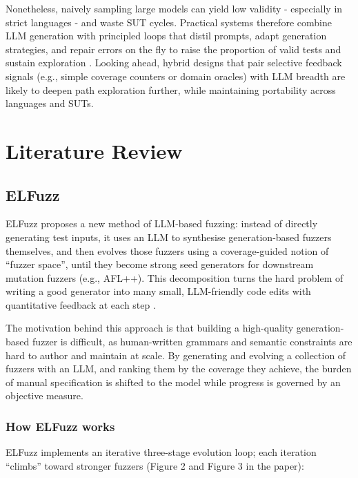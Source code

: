 Nonetheless, naively sampling large models can yield low validity - especially in strict languages - and waste SUT cycles. Practical systems therefore combine LLM generation with principled loops that distil prompts, adapt generation strategies, and repair errors on the fly to raise the proportion of valid tests and sustain exploration \cite{xia_2023_universal,lin_2025_lmfuzz}. Looking ahead, hybrid designs that pair selective feedback signals (e.g., simple coverage counters or domain oracles) with LLM breadth are likely to deepen path exploration further, while maintaining portability across languages and SUTs.





\section{Literature Review}

\subsection{ELFuzz}

ELFuzz proposes a new method of LLM-based fuzzing: instead of directly generating test inputs, it uses an LLM to synthesise generation-based fuzzers themselves, and then evolves those fuzzers using a coverage-guided notion of ``fuzzer space'', until they become strong seed generators for downstream mutation fuzzers (e.g., AFL++). This decomposition turns the hard problem of writing a good generator into many small, LLM-friendly code edits with quantitative feedback at each step \cite{chen_2025_elfuzz}.

The motivation behind this approach is that building a high-quality generation-based fuzzer is difficult, as human-written grammars and semantic constraints are hard to author and maintain at scale. By generating and evolving a collection of fuzzers with an LLM, and ranking them by the coverage they achieve, the burden of manual specification is shifted to the model while progress is governed by an objective measure. 

\subsubsection{How ELFuzz works}

ELFuzz implements an iterative three-stage evolution loop; each iteration ``climbs'' toward stronger fuzzers (Figure 2 and Figure 3 in the paper):

